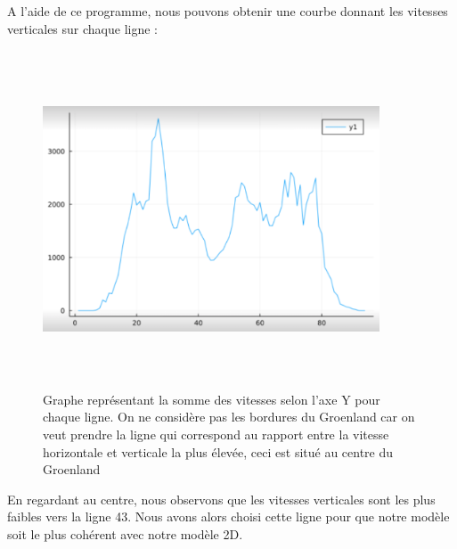 \documentclass{article}
\begin{document}
\newpage

\vspace*{\fill}
A l'aide de ce programme, nous pouvons obtenir une courbe donnant les vitesses verticales sur chaque ligne :
\begin{figure}[!htpb]
\centering
\includegraphics[width=10cm, keepaspectratio=true, height=10cm]{Vitesses.png}
\caption{Graphe représentant la somme des vitesses selon l'axe Y pour chaque ligne. On ne considère pas les bordures du Groenland car on veut prendre la ligne qui correspond au rapport entre la vitesse horizontale et verticale la plus élevée, ceci est situé au centre du Groenland }
\end{figure}
\newline
 En regardant au centre, nous observons que les vitesses verticales sont les plus faibles vers la ligne 43. Nous avons alors choisi cette ligne pour que notre modèle soit le plus cohérent avec notre modèle 2D. 
\vspace*{\fill}

\newpage
\end{document}
